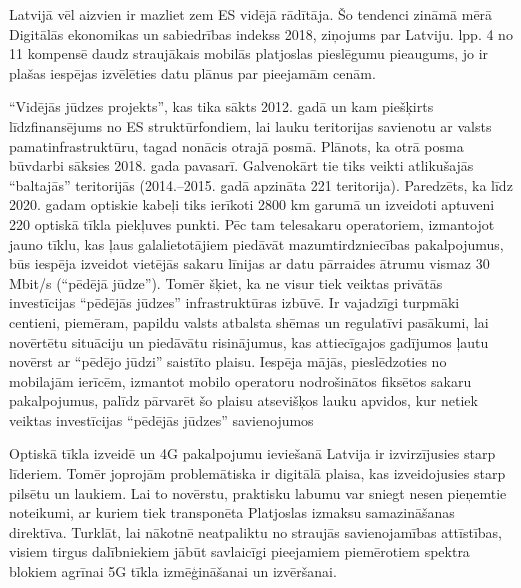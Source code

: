 Latvijā vēl aizvien ir mazliet zem ES vidējā rādītāja. Šo tendenci zināmā mērā 
Digitālās ekonomikas un sabiedrības indekss 2018, ziņojums par Latviju. lpp. 4 no 11
kompensē daudz straujākais mobilās platjoslas pieslēgumu pieaugums, jo ir plašas
iespējas izvēlēties datu plānus par pieejamām cenām.
\par
“Vidējās jūdzes projekts”, kas tika sākts 2012. gadā un kam piešķirts līdzfinansējums
no ES struktūrfondiem, lai lauku teritorijas savienotu ar valsts pamatinfrastruktūru,
tagad nonācis otrajā posmā. Plānots, ka otrā posma būvdarbi sāksies 2018. gada
pavasarī. Galvenokārt tie tiks veikti atlikušajās “baltajās” teritorijās (2014.–2015. gadā
apzināta 221 teritorija). Paredzēts, ka līdz 2020. gadam optiskie kabeļi tiks ierīkoti
2800 km garumā un izveidoti aptuveni 220 optiskā tīkla piekļuves punkti. Pēc tam
telesakaru operatoriem, izmantojot jauno tīklu, kas ļaus galalietotājiem piedāvāt
mazumtirdzniecības pakalpojumus, būs iespēja izveidot vietējās sakaru līnijas ar datu
pārraides ātrumu vismaz 30 Mbit/s (“pēdējā jūdze”). Tomēr šķiet, ka ne visur tiek
veiktas privātās investīcijas “pēdējās jūdzes” infrastruktūras izbūvē. Ir vajadzīgi
turpmāki centieni, piemēram, papildu valsts atbalsta shēmas un regulatīvi pasākumi,
lai novērtētu situāciju un piedāvātu risinājumus, kas attiecīgajos gadījumos ļautu
novērst ar “pēdējo jūdzi” saistīto plaisu. Iespēja mājās, pieslēdzoties no mobilajām
ierīcēm, izmantot mobilo operatoru nodrošinātos fiksētos sakaru pakalpojumus,
palīdz pārvarēt šo plaisu atsevišķos lauku apvidos, kur netiek veiktas investīcijas
“pēdējās jūdzes” savienojumos\cite{platjosla}
\par
Optiskā tīkla izveidē un 4G pakalpojumu ieviešanā Latvija ir izvirzījusies starp
līderiem. Tomēr joprojām problemātiska ir digitālā plaisa, kas izveidojusies starp
pilsētu un laukiem. Lai to novērstu, praktisku labumu var sniegt nesen pieņemtie
noteikumi, ar kuriem tiek transponēta Platjoslas izmaksu samazināšanas direktīva.
Turklāt, lai nākotnē neatpaliktu no straujās savienojamības attīstības, visiem tirgus
dalībniekiem jābūt savlaicīgi pieejamiem piemērotiem spektra blokiem agrīnai 5G
tīkla izmēģināšanai un izvēršanai.

